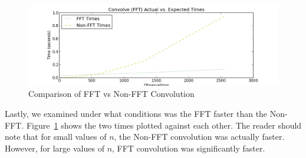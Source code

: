 \begin{figure}[H]
    \centering
        \includegraphics[width=6.5in]{./include/convolve_fft_vs_nonfft.png}
        \caption{Comparison of FFT vs Non-FFT Convolution}
        \label{fig:convolve_fft_vs_nonfft}
\end{figure}\noindent
Lastly, we examined under what conditions was the FFT faster than the Non-FFT. Figure~\ref{fig:convolve_fft_vs_nonfft} shows the two times plotted against each other. The reader should note that for small values of $n$, the Non-FFT convolution was actually faster. However, for large values of $n$, FFT convolution was significantly faster. 

